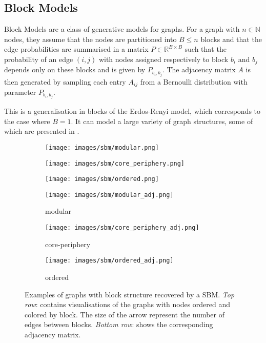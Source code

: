 \documentclass{article}
\newcommand{\R}{\mathbb{R}}
\newcommand{\N}{\mathbb{N}}
\begin{document}
\subsection{Block Models}
\label{sec:SBM}

Block Models \citep{daudin2008mixture, Peixoto_2019} are a class of generative models for graphs. For a graph with $n \in \N$ nodes, they assume that the nodes are partitioned into $B \leq n$ blocks and that the edge probabilities are summarised in a matrix $P \in \R^{B\times B}$ such that the probability of an edge $(i, j)$ with nodes assigned respectively to block $b_i$ and $b_j$ depends only on these blocks and is given by $P_{b_i, b_j}$. The adjacency matrix $A$ is then generated by sampling each entry $A_{ij}$ from a Bernoulli distribution with parameter $P_{b_i, b_j}$.

This is a generalisation in blocks of the Erdos-Renyi model, which corresponds to the case where $B = 1$. It can model a large variety of graph structures, some of which are presented in .

\begin{figure}[h]
    \centering
    \begin{subfigure}{0.3\linewidth}
        \centering
        \texttt{[image: images/sbm/modular.png]}
    \end{subfigure}
    \hfill
    \begin{subfigure}{0.3\linewidth}
        \centering
        \texttt{[image: images/sbm/core\_periphery.png]}
    \end{subfigure}
    \hfill
    \begin{subfigure}{0.3\linewidth}
        \centering
        \texttt{[image: images/sbm/ordered.png]}
    \end{subfigure}
    \vspace{1em}
    \begin{subfigure}{0.3\linewidth}
        \centering
        \texttt{[image: images/sbm/modular\_adj.png]}
        \caption{modular}
        \label{fig:modular_adj}
    \end{subfigure}
    \hfill
    \begin{subfigure}{0.3\linewidth}
        \centering
        \texttt{[image: images/sbm/core\_periphery\_adj.png]}
        \caption{core-periphery}
        \label{fig:core_adj}
    \end{subfigure}
    \hfill
    \begin{subfigure}{0.3\linewidth}
        \centering
        \texttt{[image: images/sbm/ordered\_adj.png]}
        \caption{ordered}
        \label{fig:ordered_adj}
    \end{subfigure}
    \caption{Examples of graphs with block structure recovered by a SBM. \emph{Top row}: contains visualisations of the graphs with nodes ordered and colored by block. The size of the arrow represent the number of edges between blocks. \emph{Bottom row}: shows the corresponding adjacency matrix.}
    \label{fig:SBM_structures}
\end{figure}
\end{document}
